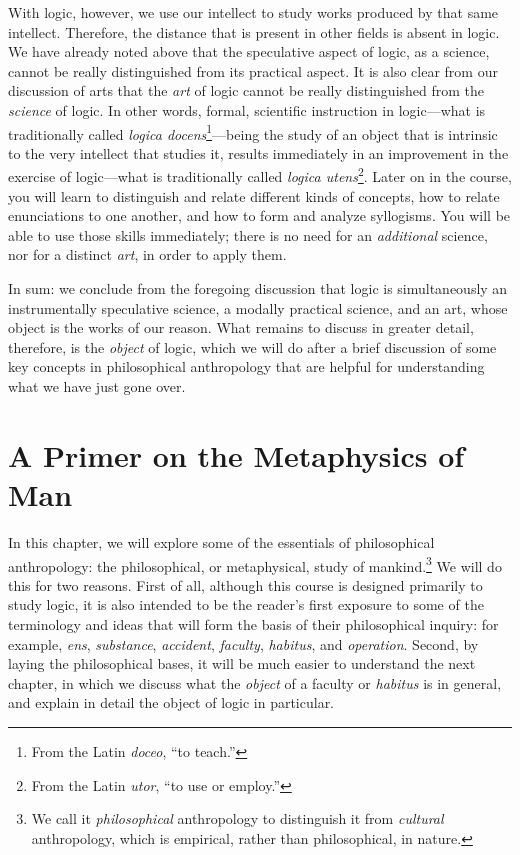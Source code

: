\documentclass[article,12pt,a4paper,oneside]{memoir}
\begin{document}
    With logic, however, we use our intellect to study works produced by
    that same intellect. Therefore, the distance that is present in
    other fields is absent in logic. We have already noted above that
    the speculative aspect of logic, as a science, cannot be really
    distinguished from its practical aspect. It is also clear from our
    discussion of arts that the \emph{art} of logic cannot be really
    distinguished from the \emph{science} of logic. In other words,
    formal, scientific instruction in logic---what is traditionally
    called \emph{logica docens}\footnote{From the Latin \emph{doceo},
      ``to teach.''}---being the study of an object that is intrinsic to
    the very intellect that studies it, results immediately in an
    improvement in the exercise of logic---what is traditionally called
    \emph{logica utens}\footnote{From the Latin \emph{utor}, ``to use or
      employ.''}. Later on in the course, you will learn to distinguish
    and relate different kinds of concepts, how to relate enunciations
    to one another, and how to form and analyze syllogisms. You will be
    able to use those skills immediately; there is no need for an
    \emph{additional} science, nor for a distinct \emph{art}, in order
    to apply them.

    In sum: we conclude from the foregoing discussion that logic is
    simultaneously an instrumentally speculative science, a modally
    practical science, and an art, whose object is the works of our
    reason. What remains to discuss in greater detail, therefore, is the
    \emph{object} of logic, which we will do after a brief discussion of
    some key concepts in philosophical anthropology that are helpful for
    understanding what we have just gone over.

    \hypertarget{a-primer-on-the-metaphysics-of-man}{%
    \chapter{A Primer on the Metaphysics of
    Man}\label{a-primer-on-the-metaphysics-of-man}}

    In this chapter, we will explore some of the essentials of
    philosophical anthropology: the philosophical, or metaphysical,
    study of mankind.\footnote{We call it \emph{philosophical}
      anthropology to distinguish it from \emph{cultural} anthropology,
      which is empirical, rather than philosophical, in nature.} We will
    do this for two reasons. First of all, although this course is
    designed primarily to study logic, it is also intended to be the
    reader's first exposure to some of the terminology and ideas that
    will form the basis of their philosophical inquiry: for example,
    \emph{ens}, \emph{substance}, \emph{accident}, \emph{faculty},
    \emph{habitus}, and \emph{operation}. Second, by laying the
    philosophical bases, it will be much easier to understand the next
    chapter, in which we discuss what the \emph{object} of a faculty or
    \emph{habitus} is in general, and explain in detail the object of
    logic in particular.
\end{document}
